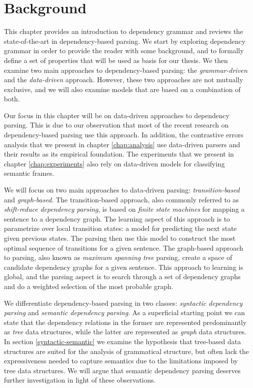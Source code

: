 \chapter{Background}
\label{chap:background}

This chapter provides an introduction to dependency grammar and reviews the state-of-the-art in dependency-based parsing. We start by exploring dependency grammar in order to provide the reader with some background, and to formally define a set of properties that will be used as basis for our thesis. We then examine two main approaches to dependency-based parsing: the \textit{grammar-driven} and the \textit{data-driven} approach. However, these two approaches are not mutually exclusive, and we will also examine models that are based on a combination of both. 

Our focus in this chapter will be on data-driven approaches to dependency parsing. This is due to our observation that most of the recent research on dependency-based parsing use this approach. In addition, the contrastive errors analysis that we present in chapter \ref{chap:analysis} use data-driven parsers and their results as its empirical foundation. The experiments that we present in chapter \ref{chap:experiments} also rely on data-driven models for classifying semantic frames.

We will focus on two main approaches to data-driven parsing: \textit{transition-based} and \textit{graph-based}. The transition-based approach, also commonly referred to as \textit{shift-reduce dependency parsing}, is based on \textit{finite state machines} for mapping a sentence to a dependency graph. The learning aspect of this approach is to parametrize over local transition states: a model for predicting the next state given previous states. The parsing then use this model to construct the most optimal sequence of transitions for a given sentence. The graph-based approach to parsing, also known as \textit{maximum spanning tree} parsing, create a space of candidate dependency graphs for a given sentence. This approach to learning is global, and the parsing aspect is to search through a set of dependency graphs and do a weighted selection of the most probable graph.


We differentiate dependency-based parsing in two classes: \textit{syntactic dependency parsing} and \textit{semantic dependency parsing}. As a superficial starting point we can state that the dependency relations in the former are represented predominantly as \textit{tree} data structures, while the latter are represented as \textit{graph} data structures. In section \ref{syntactic-semantic} we examine the hypothesis that tree-based data structures are suited for the analysis of grammatical structure, but often lack the expressiveness needed to capture semantics due to the limitations imposed by tree data structures. We will argue that semantic dependency parsing deserves further investigation in light of these observations.

